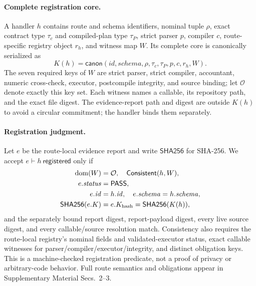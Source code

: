 \documentclass[letterpaper]{article}
\begin{document}
\paragraph{Complete registration core.}
A handler $h$ contains route and schema identifiers, nominal tuple $\rho$,
exact contract type $\tau_c$ and compiled-plan type $\tau_P$, strict parser
$p$, compiler $c$,
route-specific registry object $r_h$, and witness map $W$.  Its complete core
is canonically serialized as
\[
 K(h)=\mathsf{canon}(\mathit{id},\mathit{schema},\rho,
 \tau_c,\tau_P,p,c,r_h,W).
\]
The seven required keys of $W$ are strict parser, strict compiler, accountant,
numeric cross-check, executor, postcompile integrity, and source binding; let
$\mathcal O$ denote exactly this key set.
Each witness names a callable, its repository path, and the exact file digest.
The evidence-report path and digest are outside $K(h)$ to avoid a circular
commitment; the handler binds them separately.

\paragraph{Registration judgment.}
Let $e$ be the route-local evidence report and write $\mathsf{SHA256}$ for
SHA-256.  We accept
$e\vdash h\ \mathsf{registered}$ only if
\begin{equation}
\begin{split}
\operatorname{dom}(W)&=\mathcal O,\quad\mathsf{Consistent}(h,W),\\
e.\mathit{status}&=\mathsf{PASS},\\
e.\mathit{id}&=h.\mathit{id},\quad
e.\mathit{schema}=h.\mathit{schema},\\
\mathsf{SHA256}(e.K)&=e.K_{\rm hash}=\mathsf{SHA256}(K(h)),
\end{split}
\label{eq:registration}
\end{equation}
and the separately bound report digest, report-payload digest, every live
source digest, and every callable/source resolution match.  Consistency also
requires the route-local registry's nominal fields and validated-executor
status, exact callable witnesses for parser/compiler/executor/integrity, and
distinct obligation keys.  This is a machine-checked registration predicate,
not a proof of privacy or arbitrary-code behavior.  Full route semantics and
obligations appear in Supplementary Material Secs.~2--3.
\end{document}
